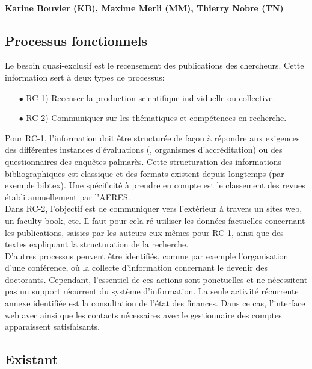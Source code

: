 \documentclass{book}
\begin{document}
\paragraph{Karine Bouvier (KB), Maxime Merli (MM), Thierry Nobre (TN)}

\subsection{Processus fonctionnels}

Le besoin quasi-exclusif est le recensement des publications des chercheurs.
Cette information sert à deux types de processus:
\begin{itemize}
\item[$\bullet$] RC-1) Recenser la production scientifique individuelle ou 
		     collective.
\item[$\bullet$] RC-2) Communiquer sur les thématiques et compétences 
		     en recherche.
\end{itemize}

\bigskip
Pour RC-1, l'information doit être structurée de façon à répondre aux 
exigences des différentes instances d'évaluations (, organismes 
d'accréditation) ou des questionnaires des enquêtes palmarès.
Cette structuration des informations bibliographiques est classique et des
formats existent depuis longtemps (par exemple bibtex). Une spécificité
à prendre en compte est le classement des revues établi annuellement par 
l'AERES.\\

Dans  RC-2, l'objectif est de communiquer vers l'extérieur à travers un 
sites web, un faculty book, etc. Il faut pour cela ré-utiliser les données
factuelles concernant les publications, saisies par les auteurs eux-mêmes
pour RC-1, ainsi que des textes expliquant la structuration de la recherche.\\

D'autres processus peuvent être identifiés, comme par exemple l'organisation
d'une conférence, où la collecte d'information concernant le devenir des
doctorants. Cependant, l'essentiel de ces actions sont ponctuelles et ne 
nécessitent pas un support récurrent du système d'information. La seule 
activité récurrente annexe identifiée est la consultation de l'état des 
finances. Dans ce cas, l'interface web avec  ainsi que les 
contacts nécessaires avec le gestionnaire des comptes apparaissent satisfaisants.


\subsection{Existant}
\end{document}
